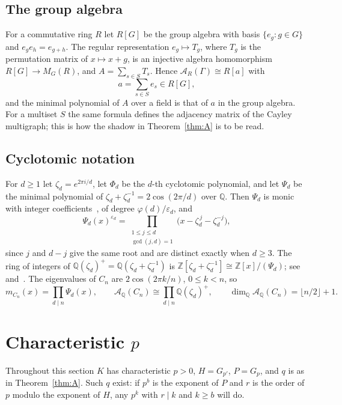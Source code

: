 \documentclass[11pt]{amsart}
\theoremstyle{definition}
\theoremstyle{remark}
\numberwithin{equation}{section}
\newcommand{\Q}{\mathbb{Q}}
\newcommand{\Z}{\mathbb{Z}}
\newcommand{\cA}{\mathcal{A}}
\begin{document}
\subsection{The group algebra} For a commutative ring $R$ let $R[G]$ be the group algebra with basis $\{e_g:g\in G\}$ and $e_ge_h=e_{g+h}$. The regular representation $e_g\mapsto T_g$, where $T_g$ is the permutation matrix of $x\mapsto x+g$, is an injective algebra homomorphism $R[G]\to M_G(R)$, and $A=\sum_{s\in S}T_s$. Hence $\cA_R(\Gamma)\cong R[a]$ with
\[
a=\sum_{s\in S}e_s\in R[G],
\]
and the minimal polynomial of $A$ over a field is that of $a$ in the group algebra. For a multiset $S$ the same formula defines the adjacency matrix of the Cayley multigraph; this is how the shadow in Theorem~\ref{thm:A} is to be read.

\subsection{Cyclotomic notation} For $d\ge1$ let $\zeta_d=e^{2\pi i/d}$, let $\Phi_d$ be the $d$-th cyclotomic polynomial, and let $\Psi_d$ be the minimal polynomial of $\zeta_d+\zeta_d^{-1}=2\cos(2\pi/d)$ over $\Q$. Then $\Psi_d$ is monic with integer coefficients~\cite{Le}, of degree $\varphi(d)/\varepsilon_d$, and
\begin{equation}\label{eq:Psi-roots}
\Psi_d(x)^{\varepsilon_d}=\prod_{\substack{1\le j\le d\\ \gcd(j,d)=1}}\bigl(x-\zeta_d^{\,j}-\zeta_d^{-j}\bigr),
\end{equation}
since $j$ and $d-j$ give the same root and are distinct exactly when $d\ge3$. The ring of integers of $\Q(\zeta_d)^+=\Q(\zeta_d+\zeta_d^{-1})$ is $\Z[\zeta_d+\zeta_d^{-1}]\cong\Z[x]/(\Psi_d)$; see~\cite[Proposition~2.16]{Wa} and~\cite{Li}. The eigenvalues of $C_n$ are $2\cos(2\pi k/n)$, $0\le k<n$, so
\begin{equation}\label{eq:mCn}
m_{C_n}(x)=\prod_{d\mid n}\Psi_d(x),\qquad \cA_\Q(C_n)\cong\prod_{d\mid n}\Q(\zeta_d)^+,\qquad \dim_\Q\cA_\Q(C_n)=\lfloor n/2\rfloor+1 .
\end{equation}

\section{Characteristic \texorpdfstring{$p$}{p}}\label{sec:modular}

Throughout this section $K$ has characteristic $p>0$, $H=G_{p'}$, $P=G_p$, and $q$ is as in Theorem~\ref{thm:A}. Such $q$ exist: if $p^b$ is the exponent of $P$ and $r$ is the order of $p$ modulo the exponent of $H$, any $p^k$ with $r\mid k$ and $k\ge b$ will do.
\end{document}
